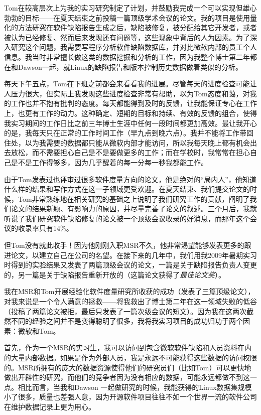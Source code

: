 \documentclass[letter,12pt]{book}
\begin{document}
\begin{CJK}{UTF8}{gbsn}
\breakline

Tom在较高层次上为我的实习研究制定了计划，并鼓励我完成一个可以实现但雄心勃勃的目标——在夏天结束之前投稿一篇顶级学术会议的论文。我的项目是使用量化的方法研究在软件缺陷报告生成之后，缺陷被修复，被分配给其它开发者，或者被认为已经修复、然而后来发现还有问题等，这些现象中背后的人为因素。为了深入研究这个问题，我需要写程序分析软件缺陷数据库，并对比微软内部的员工个人信息。我当时非常擅长做这类的数据挖掘和分析的工作，因为我整个博士第二年都在和Dawson一起，就Linux的缺陷报告和版本控制历史数据做着类似的分析。

每天下午五点，Tom在下班之前都会来看看我的进展。尽管每天的进度检查可能让人压力很大，但实际上我发现这些进度检查非常有帮助，以为Tom态度和蔼，对我的工作也并不抱有批判的态度。每天都能得到及时的反馈，让我能保证专心在工作上，也更有工作的动力。这种确定、短期的目标和持续、有效的反馈的组合，使得我实习期间的工作日比之前三年博士生涯中任何一段时间都更加高效。最让我开心的是，我每天只在正常的工作时间工作（早九点到晚六点）。我并不能将工作带回住处，以为我需要的数据都只能从微软内部才能访问，所以我每天晚上都有机会出去放松，而不需要担心自己是不是要做更多的工作；而在学校时，我常常在担心自己是不是工作得够多，因为几乎醒着的每一分每一秒我都能工作。

由于Tom发表过也评审过很多软件度量方向的论文，他是绝对的“局内人”，他知道什么样的结果和写作方式在这一子领域更受欢迎。在夏天结束、我们提交论文的时候，Tom非常熟练地在相关研究的基础之上说明了我们研究工作的贡献，阐明了我们论文的结果新颖、有影响力的原因，并尽量完善了论文的叙述。三个月后，我就听说了我们研究软件缺陷修复的论文被一个顶级会议收录的好消息，而那年这个会议的收录率只有14\%。

但Tom没有就此收手！因为他刚刚入职MSR不久，他非常渴望能够发表更多的跟进论文，以建立自己在公司的名望。在接下来的几年中，我们用我2009年暑期实习时得到的实验结果又发表了两篇顶级会议的论文，一篇是关于缺陷报告负责人变更的，另一篇是关于缺陷报告重新开放的（这篇论文获得了\emph{最佳论文奖}）。

\breakline

我在MSR和Tom开展经验化软件度量研究所收获的成功（发表了三篇顶级论文），对我来说是一个令人满意的拯救——将我救出了博士第二年在这一领域失败的低谷（投稿了两篇论文被拒，最后只发表了一篇次级会议的短文）。因为我在这两次截然不同的经验之间并不是变得聪明了很多，我将我实习项目的成功归功于两个因素：微软和Tom。

首先，作为一个MSR的实习生，我可以访问到包含微软软件缺陷和人员资料在内的大量内部数据。如果是作为外部人员，我是永远不可能获得这些数据的访问权限的。MSR所拥有的庞大的数据资源使得他们的研究员们（比如Tom）可以更快地做出开辟性的研究，而他们的竞争者因为没有相应的数据，可能永远都做不到这一点。相比而言，当我和Dawson 一起做研究的时候，我能获得的Linux数据集规模小了很多，质量也差强人意，因为开源软件项目往往不如一个世界一流的软件公司在维护数据记录上更为用心。


\end{CJK}
\end{document}
